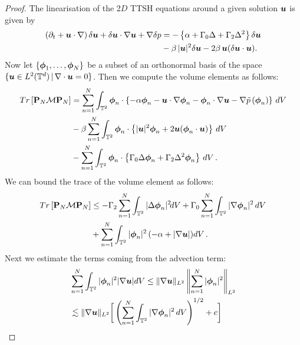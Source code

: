 \documentclass[11pt]{amsart}
\newcommand{\bphi}{\mbox{\boldmath$\phi$}}
\newcommand{\bu}{\mbox{\boldmath$u$}}
\newcommand{\Rb}{\beta}
\newcommand{\Gamzero}{\Gamma_{0}}
\newcommand{\Gamtwo}{\Gamma_{2}}
\theoremstyle{definition}
\numberwithin{equation}{section}
\numberwithin{equation}{section}
\begin{document}
\par\smallskip\noindent
\begin{proof}
The linearisation of the 2$D$ TTSH equations around a given solution $\bu$ is given by
\begin{align}
\left(\partial_{t} + \bu\cdot\nabla\right)\delta\bu + \delta\bu\cdot\nabla\bu + \nabla \delta p 
&= -\left\{\alpha + \Gamzero \Delta + \Gamtwo \Delta^{2}\right\}\delta\bu\nonumber\\
&- \Rb\,\lvert \bu \rvert^{2}\delta\bu - 2\Rb\,\bu(\delta \bu \cdot \bu ).
\end{align}
Now let $\{ \bphi_1, \ldots, \bphi_N \}$ be a subset of an orthonormal basis of the space $\{ \bu \in L^2 (\mathbb{T}^d) \, \lvert \, \nabla \cdot \bu = 0 \}$. Then we compute the volume elements as follows:
\begin{align}\label{betaterm}
Tr \left[\mathbf{P}_{N}\mathcal{M}\mathbf{P}_{N}\right]  &= \sum_{n=1}^{N}
\int_{\mathbb{T}^2} \bphi_{n}\cdot\left\{-\alpha\bphi_{n} - \bu\cdot\nabla\bphi_{n}-\bphi_{n}\cdot\nabla\bu 
- \nabla\tilde{p}\left(\bphi_{n}\right)\right\}\,dV\nonumber\\
&-\Rb\sum_{n=1}^{N}\int_{\mathbb{T}^2} \bphi_{n}\cdot\left\{\lvert \bu \rvert^{2}\bphi_{n} + 2 \bu (\bphi_{n} \cdot \bu) \right\}\,dV\,\nonumber\\
&-\sum_{n=1}^{N}\int_{\mathbb{T}^2} \bphi_{n}\cdot\left\{\Gamzero \Delta\bphi_{n} + \Gamtwo \Delta^{2}\bphi_{n}\right\}\,dV\,.
\end{align}
We can bound the trace of the volume element as follows:
\begin{align}
Tr \left[ \mathbf{P}_{N}\mathcal{M}\mathbf{P}_{N}\right] &\leq - \Gamtwo \sum_{n=1}^{N} \int_{\mathbb{T}^2} |\Delta\bphi_{n}|^{2}\!
dV + \Gamzero \sum_{n=1}^{N} \int_{\mathbb{T}^2} |\nabla\bphi_{n}|^{2}\,dV \nonumber \\
&+ \sum_{n=1}^{N} \int_{\mathbb{T}^2}|\bphi_{n}|^{2} \left(-\alpha + |\nabla \bu |\right)\!dV\,. \label{2dtraceestimate}
\end{align}
Next we estimate the terms coming from the advection term:
\begin{align*}
&\sum_{n=1}^{N} \int_{\mathbb{T}^2}|\bphi_{n}|^{2} \lvert \nabla \bu \rvert dV \leq \lVert \nabla \bu \rVert_{L^2} \left\lVert \sum_{n=1}^{N} |\bphi_{n}|^{2} \right\rVert_{L^2} \\
&\lesssim \lVert \nabla \bu \rVert_{L^2} \bigg[ \left( \sum_{n=1}^{N} \int_{\mathbb{T}^2} |\nabla\bphi_{n}|^{2}\,dV \right)^{1/2} + c \bigg] \\

\end{align*}
\end{proof}
\end{document}
